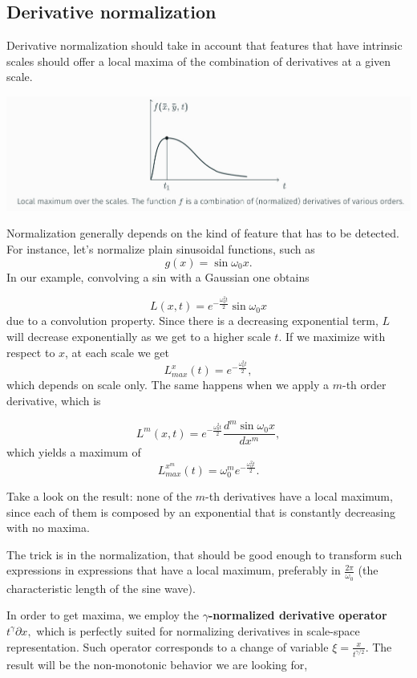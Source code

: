 \documentclass[10pt]{report}
\begin{document}
\subsection{Derivative normalization}
\label{derivative-normalization}
Derivative normalization should take in account that features that have
intrinsic scales should offer a local maxima of the combination of
derivatives at a given scale.

\begin{center}
\includegraphics[width=.9\linewidth]{./pics/det/derivative-normalization.jpg}
\end{center}

Normalization generally depends on the kind of feature that has to be
detected. For instance, let's normalize plain sinusoidal functions, such
as \[ g(x) = \sin{\omega_0 x}.\] In our example, convolving a sin with a
Gaussian one obtains

\[L(x, t) = e^{-\frac{\omega_0^2 t}{2}}\sin{\omega_0 x}\] due to a
convolution property. Since there is a decreasing exponential term,
\(L\) will decrease exponentially as we get to a higher scale \(t\). If
we maximize with respect to \(x\), at each scale we get
\[L_{max}^x (t) = e^{-\frac{\omega_0^2 t}{2}},\] which depends on scale
only. The same happens when we apply a \(m\)-th order derivative, which
is

\[L^m(x, t) = e^{-\frac{\omega_0^2 t}{2}}\frac{d^m \sin{\omega_0 x}}{dx^m},\]
which yields a maximum of
\[L^{x^m}_ {max}(t) = \omega_0^m e^{-\frac{\omega_0^2 t}{2}}.\]

Take a look on the result: none of the \(m\)-th derivatives have a local
maximum, since each of them is composed by an exponential that is
constantly decreasing with no maxima.

The trick is in the normalization, that should be good enough to
transform such expressions in expressions that have a local maximum,
preferably in \(\frac{2\pi}{\omega_0}\) (the characteristic length of
the sine wave).

In order to get maxima, we employ the \textbf{\(\gamma\)-normalized derivative
operator} \(t^\gamma \partial x,\) which is perfectly suited for
normalizing derivatives in scale-space representation. Such operator
corresponds to a change of variable \(\xi = \frac{x}{t^{\gamma/2}}.\)
The result will be the non-monotonic behavior we are looking for,
\end{document}
